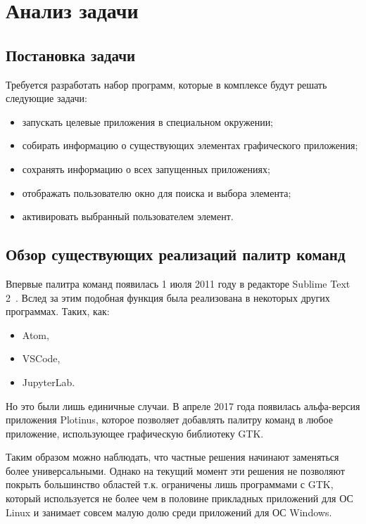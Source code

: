 \chapter{Анализ задачи}

\section{Постановка задачи}

Требуется разработать набор программ, которые в комплексе будут решать следующие
задачи:

\begin{itemize}
	\item запускать целевые приложения в специальном окружении;
	\item собирать информацию о существующих элементах графического приложения;
	\item сохранять информацию о всех запущенных приложениях;
	\item отображать пользователю окно для поиска и выбора элемента;
	\item активировать выбранный пользователем элемент.
\end{itemize}

\section{Обзор существующих реализаций палитр команд}\label{analogs}

Впервые палитра команд появилась 1 июля 2011 году в редакторе Sublime Text
2~\cite{sublimetext2changelog}. Вслед за этим подобная функция была реализована
в некоторых других программах. Таких, как:
\begin{itemize}
	\item Atom\cite{atom},
	\item VSCode\cite{vscode},
	\item JupyterLab\cite{jupyterlab}.
\end{itemize}

Но это были лишь единичные случаи. В апреле 2017 года появилась альфа-версия
приложения Plotinus\cite{plotinus}, которое позволяет добавлять палитру команд в
любое приложение, использующее графическую библиотеку GTK.

Таким образом можно наблюдать, что частные решения начинают заменяться более
универсальными. Однако на текущий момент эти решения не позволяют покрыть
большинство областей т.к. ограничены лишь программами с GTK, который
используется не более чем в половине прикладных приложений для ОС Linux и
занимает совсем малую долю среди приложений для ОС Windows.

